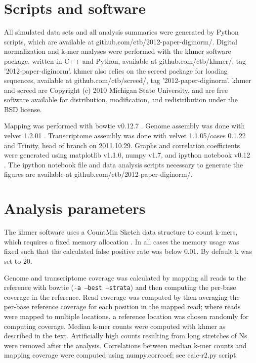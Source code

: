 \documentclass{pnastwo}
\begin{document}
\begin{article}
\begin{materials}
\section{Scripts and software}

All simulated data sets and all analysis summaries were generated by
Python scripts, which are available at
github.com/ctb/2012-paper-diginorm/.  Digital normalization and k-mer
analyses were performed with the khmer software package, written in
C++ and Python, available at github.com/ctb/khmer/, tag
'2012-paper-diginorm'.  khmer also relies on the screed package for
loading sequences, available at github.com/ctb/screed/, tag
'2012-paper-diginorm'.  khmer and screed are Copyright (c) 2010
Michigan State University, and are free software available for
distribution, modification, and redistribution under the BSD license.

Mapping was performed with bowtie v0.12.7 \cite{pubmed19261174}.
Genome assembly was done with velvet 1.2.01 \cite{pubmed18349386}.
Transcriptome assembly was done with velvet 1.1.05/oases 0.1.22 and
Trinity, head of branch on 2011.10.29.
Graphs and correlation coefficients were generated using matplotlib
v1.1.0, numpy v1.7, and ipython notebook v0.12 \cite{ipython}.  The
ipython notebook file and data analysis scripts necessary to generate
the figures are available at 
  github.com/ctb/2012-paper-diginorm/.


\section{Analysis parameters}

The khmer software uses a CountMin Sketch data structure to count
k-mers, which requires a fixed memory allocation
\cite{countminsketch}.  In all cases the memory usage was fixed such
that the calculated false positive rate was below 0.01.  By default k
was set to 20.

Genome and transcriptome coverage was calculated by mapping all reads
to the reference with bowtie ({\tt -a --best --strata}) and then
computing the per-base coverage in the reference.  Read coverage was
computed by then averaging the per-base reference coverage for each
position in the mapped read; where reads were mapped to multiple
locations, a reference location was chosen randomly for computing
coverage.  Median k-mer counts were computed with khmer as described
in the text.  Artificially high counts resulting from long stretches
of Ns were removed after the analysis.
Correlations between median k-mer counts and mapping coverage were
computed using numpy.corrcoef; see calc-r2.py script.


\end{materials}
\end{article}
\end{document}
